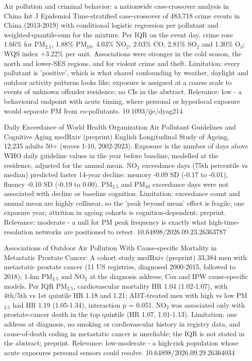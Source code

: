 \documentclass[10pt]{article}
\begin{document}

{Air pollution and criminal behavior: a nationwide case-crossover analysis in China}
{Int J Epidemiol}
{Time-stratified case-crossover of 483,718 crime events in China (2013-2019) with conditional logistic regression per pollutant and weighted-quantile-sum for the mixture. Per IQR on the event day, crime rose 1.66\% for PM$_{2.5}$, 1.88\% PM$_{10}$, 4.03\% NO$_2$, 2.03\% CO, 2.81\% SO$_2$ and 1.30\% O$_3$; WQS index +3.22\% per unit. Associations were stronger in the cold season, the north and lower-SES regions, and for violent crime and theft. Limitation: every pollutant is 'positive', which is what shared confounding by weather, daylight and outdoor activity patterns looks like; exposure is assigned at a coarse scale to events of unknown offender residence; no CIs in the abstract. Relevance: low - a behavioural endpoint with acute timing, where personal or hyperlocal exposure would separate PM from co-pollutants.}
{10.1093/ije/dyag214}

{Daily Exceedance of World Health Organization Air Pollutant Guidelines and Cognitive Aging}
{medRxiv (preprint)}
{English Longitudinal Study of Ageing, 12,235 adults 50+ (waves 1-10, 2002-2023). Exposure is the number of days above WHO daily guideline values in the year before baseline, modelled at the residence, adjusted for the annual mean. NO$_2$ exceedance days (75th percentile vs median) predicted faster 14-year decline: memory -0.09 SD (-0.17 to -0.01), fluency -0.10 SD (-0.19 to 0.00). PM$_{2.5}$ and PM$_{10}$ exceedance days were not associated with decline or baseline cognition. Limitation: exceedance count and annual mean are highly collinear, so the 'peak beyond mean' effect is fragile; one exposure year; attrition in ageing cohorts is cognition-dependent; preprint. Relevance: moderate - a null for PM peak frequency is exactly what high-time-resolution networks are positioned to retest.}
{10.64898/2026.09.23.26363787}

\par{}\baselineskip{}\baselineskip
{}

{Associations of Outdoor Air Pollution With Cause-specific Mortality in Metastatic Prostate Cancer: A cohort study}
{medRxiv (preprint)}
{33,384 men with metastatic prostate cancer (11 US registries, diagnosed 2000-2015, followed to 2018); 1-km PM$_{2.5}$ and NO$_2$ at the diagnosis address; Cox and IPW cause-specific models. Per IQR PM$_{2.5}$, cardiovascular mortality HR 1.04 (1.02-1.07), with 4th/5th vs 1st quintile HR 1.18 and 1.21; ADT-treated men with high vs low PM$_{2.5}$ had HR 1.19 (1.05-1.34), interaction p = 0.051. NO$_2$ was associated only with prostate-cancer death in the top quintile (HR 1.07, 1.01-1.13). Limitation: one address at diagnosis, no smoking or cardiovascular history in registry data, and cause-of-death coding in metastatic cancer is unreliable; the IQR is not stated in the abstract; preprint. Relevance: low-moderate - a high-risk population whose acute exposures personal sensors could resolve.}
{10.64898/2026.09.29.26364034}
\end{document}
